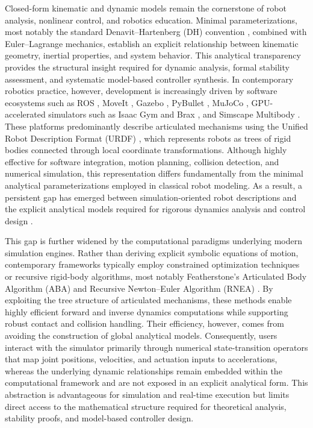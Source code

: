 \documentclass[fleqn,10pt]{article}
\begin{document}
Closed-form kinematic and dynamic models remain the cornerstone of robot analysis, nonlinear control, and robotics education. Minimal parameterizations, most notably the standard Denavit--Hartenberg (DH) convention \cite{denavit1955kinematic, corke2007simple, craig2005introduction, spong2020robot, siciliano2010robotics}, combined with Euler--Lagrange mechanics, establish an explicit relationship between kinematic geometry, inertial properties, and system behavior. This analytical transparency provides the structural insight required for dynamic analysis, formal stability assessment, and systematic model-based controller synthesis. In contemporary robotics practice, however, development is increasingly driven by software ecosystems such as ROS \cite{quigley2009ros}, MoveIt \cite{chitta2012moveit}, Gazebo \cite{koenig2004design}, PyBullet \cite{coumans2016pybullet}, MuJoCo \cite{todorov2012mujoco}, GPU-accelerated simulators such as Isaac Gym \cite{makoviychuk2021isaac} and Brax \cite{freeman2021brax}, and Simscape Multibody \cite{simscape2023multibody}. These platforms predominantly describe articulated mechanisms using the Unified Robot Description Format (URDF) \cite{tola2024understanding, chignoli2024urdf}, which represents robots as trees of rigid bodies connected through local coordinate transformations. Although highly effective for software integration, motion planning, collision detection, and numerical simulation, this representation differs fundamentally from the minimal analytical parameterizations employed in classical robot modeling. As a result, a persistent gap has emerged between simulation-oriented robot descriptions and the explicit analytical models required for rigorous dynamics analysis and control design \cite{iliuta2024digital, dimosthenopoulos2024digital}.

This gap is further widened by the computational paradigms underlying modern simulation engines. Rather than deriving explicit symbolic equations of motion, contemporary frameworks typically employ constrained optimization techniques \cite{todorov2012mujoco} or recursive rigid-body algorithms, most notably Featherstone's Articulated Body Algorithm (ABA) and Recursive Newton--Euler Algorithm (RNEA) \cite{featherstone2008rigid, carpentier2019pinocchio}. By exploiting the tree structure of articulated mechanisms, these methods enable highly efficient forward and inverse dynamics computations while supporting robust contact and collision handling. Their efficiency, however, comes from avoiding the construction of global analytical models. Consequently, users interact with the simulator primarily through numerical state-transition operators that map joint positions, velocities, and actuation inputs to accelerations, whereas the underlying dynamic relationships remain embedded within the computational framework and are not exposed in an explicit analytical form. This abstraction is advantageous for simulation and real-time execution but limits direct access to the mathematical structure required for theoretical analysis, stability proofs, and model-based controller design.
\end{document}
